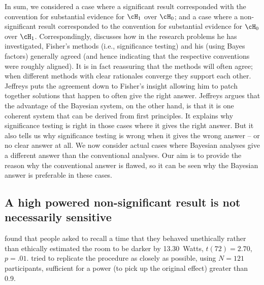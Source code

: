 In sum, we considered a case where a significant result corresponded with the convention for substantial evidence for $\cH_1$ over $\cH_0$; and a case where a non-significant result corresponded to the convention for substantial evidence for $\cH_0$ over $\cH_1$.  Correspondingly,  discusses how in the research problems he has investigated, Fisher's methods (i.e., significance testing) and his (using Bayes factors) generally agreed (and hence indicating that the respective conventions were roughly aligned). It is in fact reassuring that the methods will often agree; when different methods with clear rationales converge they support each other. Jeffreys puts the agreement down to Fisher's insight allowing him to patch together solutions that happen to often give the right answer. Jeffreys argues that the advantage of the Bayesian system, on the other hand, is that it is one coherent system that can be derived from first principles. It explains why significance testing is right in those cases where it gives the right answer.  But it also tells us why significance testing is wrong when it gives the wrong answer -- or no clear answer at all. We now consider actual cases where Bayesian analyses give a different answer than the conventional analyses. Our aim is to provide the reason why the conventional answer is flawed, so it can be seen why the Bayesian answer is preferable in these cases.

\subsection{A high powered non-significant result is not necessarily sensitive}

 found that people asked to recall a time that they behaved unethically rather than ethically estimated the room to be darker by 13.30~Watts, $t(72)=2.70$, $p = .01$.   tried to replicate the procedure as closely as possible, using $N = 121$ participants, sufficient for a power (to pick up the original effect) greater than 0.9. 

